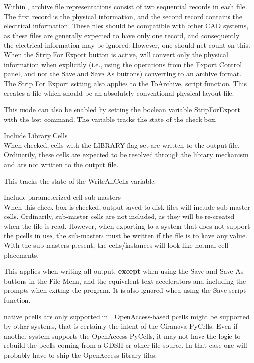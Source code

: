 \begin{description}
Within {\Xic}, archive file representations consist of two sequential
records in each file.  The first record is the physical information,
and the second record contains the electrical information.  These
files should be compatible with other CAD systems, as these files are
generally expected to have only one record, and consequently the
electrical information may be ignored.  However, one should not count
on this.  When the {\cb Strip For Export} button is active, {\Xic}
will convert only the physical information when explicitly (i.e.,
using the operations from the {\cb Export Control} panel, and not
the {\cb Save} and {\cb Save As} buttons) converting to an archive
format.  The {\cb Strip For Export} setting also applies to the {\vt
ToArchive}, script function.  This creates a file which should be an
absolutely conventional physical layout file.

This mode can also be enabled by setting the boolean variable {\et
StripForExport} with the {\cb !set} command.  The variable tracks the
state of the check box.

\item{\cb Include Library Cells}\\
When checked, cells with the LIBRARY flag set are written to the
output file.  Ordinarily, these cells are expected to be resolved
through the library mechanism and are not written to the output file.

This tracks the state of the {\et WriteAllCells} variable.

\item{\cb Include parameterized cell sub-masters}\\
When this check box is checked, output saved to disk files will
include sub-master cells.  Ordinarily, sub-master cells are not
included, as they will be re-created when the file is read.  However,
when exporting to a system that does not support the pcells in use,
the sub-masters must be written if the file is to have any value. 
With the sub-masters present, the cells/instances will look like
normal cell placements.

This applies when writing all output, {\bf except} when using the {\cb
Save} and {\cb Save As} buttons in the {\cb File Menu}, and the
equivalent text accelerators and including the prompts when exiting
the program.  It is also ignored when using the {\vt Save} script
function.

{\Xic} native pcells are only supported in {\Xic}.  OpenAccess-based
pcells might be supported by other systems, that is certainly the
intent of the Ciranova PyCells.  Even if another system supports the
OpenAccess PyCells, it may not have the logic to rebuild the pcells
coming from a GDSII or other file source.  In that case one will
probably have to ship the OpenAccess library files.


\end{description}
